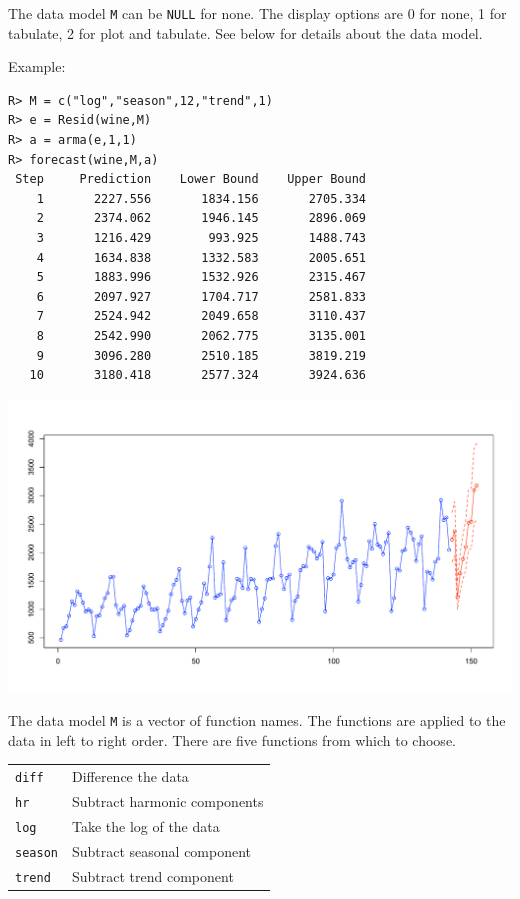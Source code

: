 \documentclass[11pt]{article}
\begin{document}
\bigskip
\noindent
The data model {\tt M} can be {\tt NULL} for none.
The display options are 0 for none, 1 for tabulate,
2 for plot and tabulate.
See below for details about the data model.

\bigskip
\noindent
Example:

\begin{verbatim}
R> M = c("log","season",12,"trend",1)
R> e = Resid(wine,M)
R> a = arma(e,1,1)
R> forecast(wine,M,a)
 Step     Prediction    Lower Bound    Upper Bound
    1       2227.556       1834.156       2705.334
    2       2374.062       1946.145       2896.069
    3       1216.429        993.925       1488.743
    4       1634.838       1332.583       2005.651
    5       1883.996       1532.926       2315.467
    6       2097.927       1704.717       2581.833
    7       2524.942       2049.658       3110.437
    8       2542.990       2062.775       3135.001
    9       3096.280       2510.185       3819.219
   10       3180.418       2577.324       3924.636
\end{verbatim}

\begin{center}
\includegraphics[scale=0.3]{Rplot-34.pdf}
\end{center}

\noindent
The data model {\tt M} is a vector of function names.
The functions are applied to the data in left to right order.
There are five functions from which to choose.

\begin{center}
\begin{tabular}{ll}
{\tt diff} & Difference the data\\
{\tt hr} & Subtract harmonic components\\
{\tt log} & Take the log of the data\\
{\tt season} & Subtract seasonal component\\
{\tt trend} & Subtract trend component\\
\end{tabular}
\end{center}
\end{document}
